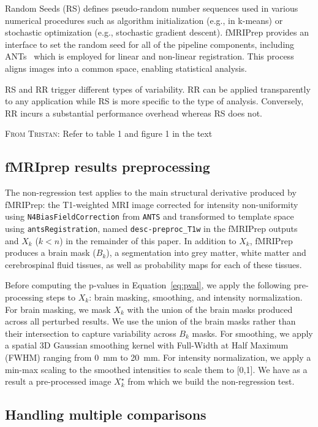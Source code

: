 \documentclass{article}
\newcommand{\TG}[1]{\color{blue}\textsc{From Tristan:} #1\color{black}\xspace}
\newcommand{\fmriprep}{fMRIPrep\xspace}
\newcommand{\fwhm}{\textsc{FWHM}}
\begin{document}
Random Seeds (RS) defines pseudo-random number sequences used in various numerical procedures such as algorithm initialization (e.g., in k-means) or stochastic optimization (e.g., stochastic gradient descent). \fmriprep provides an interface to set the random seed for all of the pipeline components, including ANTs~\cite{avants2009advanced} which is employed for linear and non-linear registration. This process aligns images into a common space, enabling statistical analysis.

RS and RR trigger different types of variability. RR can be applied transparently to any application while RS is more specific to the type of analysis. Conversely, RR incurs a substantial performance overhead whereas RS does not.

\TG{Refer to table 1 and figure 1 in the text}

\subsection{fMRIprep results preprocessing}

The non-regression test applies to the main structural derivative produced by \fmriprep: the T1-weighted MRI image corrected for intensity non-uniformity using \texttt{N4BiasFieldCorrection} from \texttt{ANTS} and transformed to template space using \texttt{antsRegistration}, named \texttt{desc-preproc\_T1w} in the \fmriprep outputs and $X_k$ ($k < n$) in the remainder of this paper. In addition to $X_k$, \fmriprep produces a brain mask ($B_k$), a segmentation into grey matter, white matter and cerebrospinal fluid tissues, as well as probability maps for each of these tissues.

Before computing the p-values in Equation~\ref{eq:pval}, we apply the following pre-processing steps to $X_k$: brain masking, smoothing, and intensity normalization. For brain masking, we mask $X_k$ with the union of the brain masks produced across all perturbed results. We use the union of the brain masks rather than their intersection to capture variability across $B_k$ masks. For smoothing, we apply a spatial 3D Gaussian smoothing kernel with Full-Width at Half Maximum (\fwhm) ranging from 0~mm to 20~mm. For intensity normalization, we apply a min-max scaling to the smoothed intensities to scale them to [0,1].
We have as a result a pre-processed image $X_k^\star$ from which we build the non-regression test.

\subsection{Handling multiple comparisons}
\end{document}
